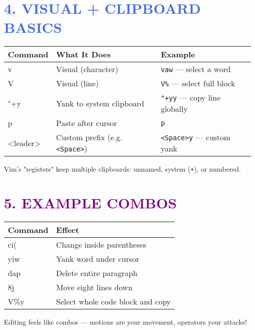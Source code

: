 \documentclass[landscape,11pt]{article}
\begin{document}
\begin{multicols}{2}
\section*{\textcolor{RoyalBlue}{4. VISUAL + CLIPBOARD BASICS}}
\renewcommand{\arraystretch}{1.1}
\begin{tabularx}{\linewidth}{@{}>{\ttfamily}l>{\raggedright\arraybackslash}X>{\raggedright\arraybackslash}X@{}}
\normalfont\textbf{Command} & \textbf{What It Does} & \textbf{Example}\\
\hline
v & Visual (character) & \texttt{vaw} — select a word\\
V & Visual (line) & \texttt{V\%} — select full block\\
"+y & Yank to system clipboard & \texttt{"+yy} — copy line globally\\
p & Paste after cursor & \texttt{p}\\
<leader> & Custom prefix (e.g. \texttt{<Space>}) & \texttt{<Space>y} — custom yank\\
\end{tabularx}
\renewcommand{\arraystretch}{1}

\vspace{2mm}
\begin{tcolorbox}[colback=RoyalBlue!8, colframe=RoyalBlue, boxsep=2pt, arc=1pt, fontupper=\small\itshape]
Vim's "registers" keep multiple clipboards: unnamed, system (\texttt{+}), or numbered.
\end{tcolorbox}

\section*{\textcolor{Purple}{5. EXAMPLE COMBOS}}
\renewcommand{\arraystretch}{1.1}
\begin{tabularx}{\linewidth}{@{}>{\ttfamily}l>{\raggedright\arraybackslash}X@{}}
\normalfont\textbf{Command} & \textbf{Effect}\\
\hline
ci( & Change inside parentheses\\
yiw & Yank word under cursor\\
dap & Delete entire paragraph\\
8j   & Move eight lines down\\
V\%y & Select whole code block and copy\\
\end{tabularx}
\renewcommand{\arraystretch}{1}

\vspace{2mm}
\begin{tcolorbox}[colback=Purple!8, colframe=Purple, boxsep=2pt, arc=1pt, fontupper=\small\itshape]
Editing feels like combos — motions are your movement, operators your attacks!
\end{tcolorbox}


\end{multicols}
\end{document}
